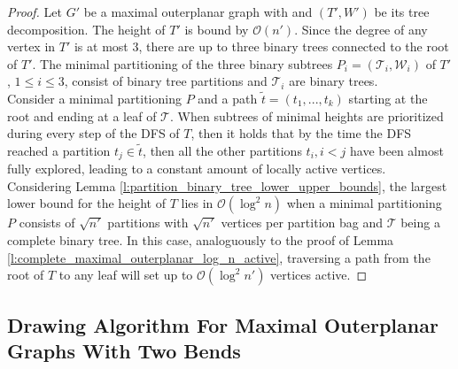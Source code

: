 \begin{proof}
	Let $G'$ be a maximal outerplanar graph with and $(T',W')$ be its tree decomposition. The height of $T'$ is bound by $\mathcal{O}(n')$. Since the degree of any vertex in $T'$ is at most 3, there are up to three binary trees connected to the root of $T'$. The minimal partitioning of the three binary subtrees $P_i = (\mathcal{T}_i,\mathcal{W}_i)$ of $T'$, $1\leq i \leq 3$, consist of binary tree partitions and $\mathcal{T}_i$ are binary trees.\\
	Consider a minimal partitioning $P$ and a path $\tilde{t} = (t_1,...,t_k)$ starting at the root and ending at a leaf of $\mathcal{T}$. When subtrees of minimal heights are prioritized during every step of the DFS of $T$, then it holds that by the time the DFS reached a partition $t_j \in \tilde{t}$, then all the other partitions $t_i, i<j$ have been almost fully explored, leading to a constant amount of locally active vertices.
	\\
	Considering Lemma \ref{l:partition_binary_tree_lower_upper_bounds}, the largest lower bound for the height of $T$ lies in $\mathcal{O}(\log^2 n)$ when a minimal partitioning $P$ consists of $\sqrt{n'}$ partitions with $\sqrt{n'}$ vertices per partition bag and $\mathcal{T}$ being a complete binary tree. In this case, analoguously to the proof of Lemma \ref{l:complete_maximal_outerplanar_log_n_active}, traversing a path from the root of $T$ to any leaf will set up to $\mathcal{O}(\log^2 n')$ vertices active.
\end{proof}

\subsection{Drawing Algorithm For Maximal Outerplanar Graphs With Two Bends}

